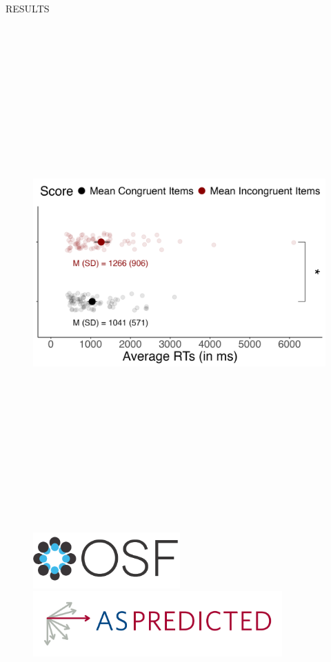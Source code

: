 \documentclass[final]{beamer}
\newlength{\colwidth}
\newlength{\widecolwidth}
\begin{document}
\begin{frame}[t]
\begin{columns}[t]
\begin{column}{\widecolwidth}
\begin{block}{RESULTS}
\begin{minipage}{0.55\textwidth}
    \begin{figure}
      \centering
      \includegraphics[height=19cm]{plots/figure1.png}
    \end{figure}
\end{minipage}%
\begin{minipage}{0.45\textwidth}
\begin{figure}
      \centering
      \href{https://aspredicted.org/DJG_YWR}{\includegraphics[height=2.125cm]{images/osf.png}}
      \href{https://aspredicted.org/DJG_YWR}{\includegraphics[height=2.5cm]{images/aspredicted.png}}

\end{figure}
\end{minipage}
\end{block}
\end{column}
\end{columns}
\end{frame}
\end{document}
